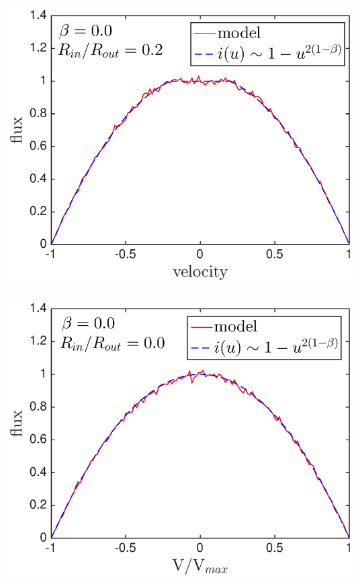 \begin{figure}
\begin{subfigure}{0.5\textwidth}
\centering
\includegraphics[trim =25 40 45 15,clip=true,scale=0.46]{chapters/chapter4/images/params/A/b0_r0_2}
\end{subfigure}
\hspace{4mm}
\begin{subfigure}{0.5\textwidth}
\centering
\includegraphics[trim =72 40 45 15,clip=true,scale=0.46]{chapters/chapter4/images/params/A/b0_r0}  
\end{subfigure} \\[0.0ex]


\end{figure}

